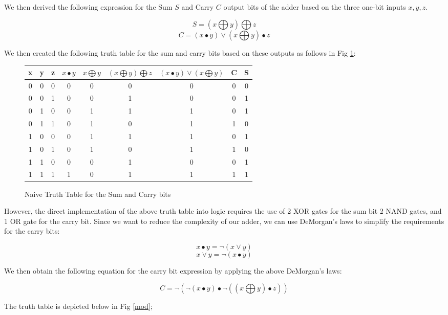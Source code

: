 \documentclass[10pt]{article}
\begin{document}
We then derived the following expression for the Sum $S$ and Carry $C$ output bits of the adder based on the three one-bit inputs $x,y,z$. 

$$ S = (x \bigoplus y) \bigoplus z$$
$$ C = (x \bullet y) \vee (x \bigoplus y) \bullet z $$

We then created the following truth table for the sum and carry bits based on these outputs as follows in Fig \ref{sum}:

\begin{figure} [H]
	\begin{table}[H]
		\centering
		\begin{tabular}{||c c c c c c c c c||} 
			\hline
			x & y &  z & $x \bullet y$ & $x \bigoplus y$ & $(x \bigoplus y) \bigoplus z$ & $ (x \bullet y) \vee (x \bigoplus y) $ & C & S\\ [0.5ex] 
			\hline\hline
			0 & 0 & 0 & 0 & 0 & 0 & 0 & 0 & 0\\ 
			0 & 0 & 1 & 0 & 0 & 1 & 0 & 0 & 1\\
			0 & 1 & 0 & 0 & 1 & 1 & 1 & 0 & 1\\
			0 & 1 & 1 & 0 & 1 & 0 & 1 & 1 & 0\\
			1 & 0 & 0 & 0 & 1 & 1 & 1 & 0 & 1\\
			1 & 0 & 1 & 0 & 1 & 0 & 1 & 1 & 0\\
			1 & 1 & 0 & 0 & 0 & 1 & 0 & 0 & 1\\
			1 & 1 & 1 & 1 & 0 & 1 & 1 & 1 & 1\\[1ex] 
			\hline
		\end{tabular}
	\end{table}
	\caption{Naive Truth Table for the Sum and Carry bits}
	\label{sum}
\end{figure}

However, the direct implementation of the above truth table into logic requires the use of 2 XOR gates for the sum bit 2 NAND gates, and 1 OR gate for the carry bit. Since we want to reduce the complexity of our adder, we can use DeMorgan's laws to simplify the requirements for the carry bits:

$$ x \bullet y = \lnot (x \vee y) $$
$$ x \vee y = \lnot (x \bullet y) $$

We then obtain the following equation for the carry bit expression by applying the above DeMorgan's laws:

$$ C = \lnot 
\left( 
\lnot (x \bullet y) \bullet \lnot 
\left( 
\left(x \bigoplus y \right) \bullet z 
\right) 
\right) $$

The truth table is depicted below in Fig \ref{mod};
\end{document}
